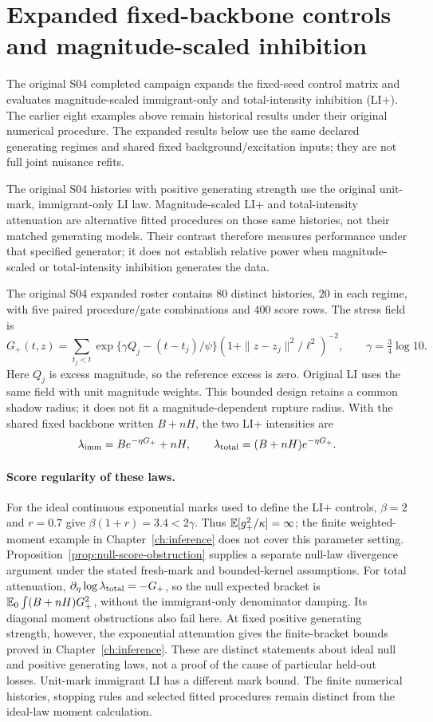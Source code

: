 \section{Expanded fixed-backbone controls and magnitude-scaled inhibition}

\label{sec:s04-expanded}

The original S04 completed campaign expands the fixed-seed control matrix and evaluates magnitude-scaled immigrant-only and total-intensity inhibition (LI+). The earlier eight examples above remain historical results under their original numerical procedure. The expanded results below use the same declared generating regimes and shared fixed background/excitation inputs; they are not full joint nuisance refits.

The original S04 histories with positive generating strength use the original unit-mark, immigrant-only LI law. Magnitude-scaled LI+ and total-intensity attenuation are alternative fitted procedures on those same histories, not their matched generating models. Their contrast therefore measures performance under that specified generator; it does not establish relative power when magnitude-scaled or total-intensity inhibition generates the data.

The original S04 expanded roster contains 80 distinct histories, 20 in each regime, with five paired procedure/gate combinations and 400 score rows. The stress field is
\[
G_+(t,z)=\sum_{t_j<t}\exp\{\gamma Q_j-(t-t_j)/\psi\}
 \left(1+\|z-z_j\|^2/\ell^2\right)^{-2},\qquad
\gamma=\tfrac34\log 10.
\]
Here $Q_j$ is excess magnitude, so the reference excess is zero. Original LI uses the same field with unit magnitude weights. This bounded design retains a common shadow radius; it does not fit a magnitude-dependent rupture radius. With the shared fixed backbone written $B+nH$, the two LI+ intensities are
\[
 \lambda_{\rm imm}=B e^{-\eta G_+}+nH,
 \qquad \lambda_{\rm total}=(B+nH)e^{-\eta G_+}.
\]
\paragraph{Score regularity of these laws.}
For the ideal continuous exponential marks used to define the LI+ controls,
$\beta=2$ and $r=0.7$ give $\beta(1+r)=3.4<2\gamma$.
Thus $\mathbb{E}[g_+^2/\kappa]=\infty$; the finite weighted-moment example in
Chapter~\ref{ch:inference} does not cover this parameter setting.
Proposition~\ref{prop:null-score-obstruction} supplies a separate null-law
divergence argument under the stated fresh-mark and bounded-kernel assumptions.
For total attenuation, $\partial_\eta\log\lambda_{\rm total}=-G_+$, so the
null expected bracket is $\mathbb{E}_0\int(B+nH)G_+^2$, without the immigrant-only
denominator damping. Its diagonal moment obstructions also fail here.
At fixed positive generating strength, however, the exponential attenuation
gives the finite-bracket bounds proved in Chapter~\ref{ch:inference}.
These are distinct statements about ideal null and positive generating laws,
not a proof of the cause of particular held-out losses. Unit-mark immigrant LI
has a different mark bound. The finite numerical histories, stopping rules and
selected fitted procedures remain distinct from the ideal-law moment calculation.


